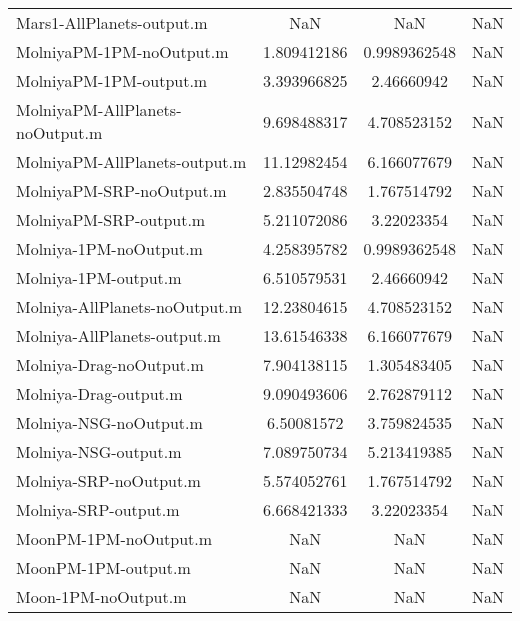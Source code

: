 \begin{table}[htbp!]
\begin{tabular}{lccc}
         Mars1-AllPlanets-output.m & NaN & NaN & NaN \\
         MolniyaPM-1PM-noOutput.m & 1.809412186 & 0.9989362548 & NaN \\
         MolniyaPM-1PM-output.m & 3.393966825 & 2.46660942 & NaN \\
         MolniyaPM-AllPlanets-noOutput.m & 9.698488317 & 4.708523152 & NaN \\
         MolniyaPM-AllPlanets-output.m & 11.12982454 & 6.166077679 & NaN \\
         MolniyaPM-SRP-noOutput.m & 2.835504748 & 1.767514792 & NaN \\
         MolniyaPM-SRP-output.m & 5.211072086 & 3.22023354 & NaN \\
         Molniya-1PM-noOutput.m & 4.258395782 & 0.9989362548 & NaN \\
         Molniya-1PM-output.m & 6.510579531 & 2.46660942 & NaN \\
         Molniya-AllPlanets-noOutput.m & 12.23804615 & 4.708523152 & NaN \\
         Molniya-AllPlanets-output.m & 13.61546338 & 6.166077679 & NaN \\
         Molniya-Drag-noOutput.m & 7.904138115 & 1.305483405 & NaN \\
         Molniya-Drag-output.m & 9.090493606 & 2.762879112 & NaN \\
         Molniya-NSG-noOutput.m & 6.50081572 & 3.759824535 & NaN \\
         Molniya-NSG-output.m & 7.089750734 & 5.213419385 & NaN \\
         Molniya-SRP-noOutput.m & 5.574052761 & 1.767514792 & NaN \\
         Molniya-SRP-output.m & 6.668421333 & 3.22023354 & NaN \\
         MoonPM-1PM-noOutput.m & NaN & NaN & NaN \\
         MoonPM-1PM-output.m & NaN & NaN & NaN \\
         Moon-1PM-noOutput.m & NaN & NaN & NaN \\

\end{tabular}
\end{table}
